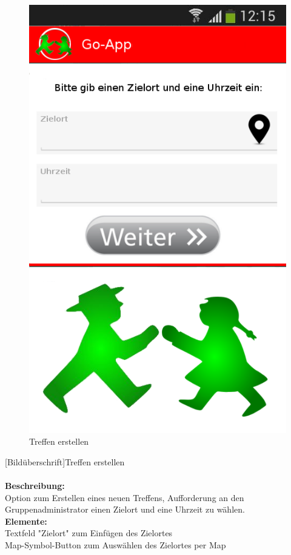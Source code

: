 \begin{figure} [H]
	\caption{Treffen erstellen}
	\includegraphics[scale =0.5]{resources/images/treffpunkt_erstellen.png}
\end{figure}
[Bildüberschrift]Treffen erstellen \\ \\
\textbf{Beschreibung:}\\
Option zum Erstellen eines neuen Treffens, Aufforderung an den Gruppenadministrator einen Zielort und eine Uhrzeit zu wählen.\\
\textbf{Elemente:}\\
Textfeld "Zielort" zum Einfügen des Zielortes\\
Map-Symbol-Button zum Auswählen des Zielortes per Map\\
